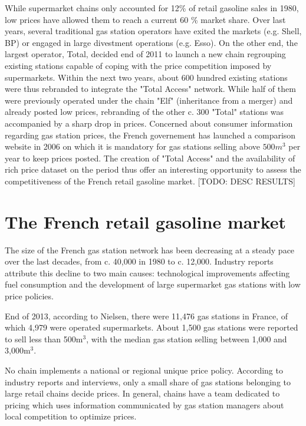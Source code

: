 \documentclass[11pt]{article}
\begin{document}
While supermarket chains only accounted for 12\% of retail gasoline sales in 1980, low prices have allowed them to reach a current 60 \% market share. Over last years, several traditional gas station operators have exited the markets (e.g. Shell, BP) or engaged in large divestment operations (e.g. Esso). On the other end, the largest operator, Total, decided end of 2011 to launch a new chain regrouping existing stations capable of coping with the price competition imposed by supermarkets. Within the next two years, about 600 hundred existing stations were thus rebranded to integrate the "Total Access" network. While half of them were previously operated under the chain "Elf" (inheritance from a merger) and already posted low prices, rebranding of the other c. 300 "Total" stations was accompanied by a sharp drop in prices.
Concerned about consumer information regarding gas station prices, the French governement has launched a comparison website in 2006 on which it is mandatory for gas stations selling above $500m^3$ per year to keep prices posted. The creation of "Total Access" and the availability of rich price dataset on the period thus offer an interesting opportunity to assess the competitiveness of the French retail gasoline market.
[TODO: DESC RESULTS]

\section{The French retail gasoline market}

The size of the French gas station network has been decreasing at a steady pace over the last decades, from c. 40,000 in 1980 to c. 12,000. Industry reports attribute this decline to two main causes: technological improvements affecting fuel consumption and the development of large supermarket gas stations with low price policies.

End of 2013, according to Nielsen, there were 11,476 gas stations in France, of which 4,979 were operated supermarkets. About 1,500 gas stations were reported to sell less than 500m$^{3}$, with the median gas station selling between 1,000 and 3,000m$^{3}$.

No chain implements a national or regional unique price policy. According to industry reports and interviews, only a small share of gas stations belonging to large retail chains decide prices. In general, chains have a team dedicated to pricing which uses information communicated by gas station managers about local competition to optimize prices.
\end{document}
